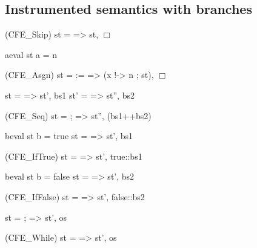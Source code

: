 \documentclass[12pt]{report}
\begin{document}
\subsection{Instrumented semantics with branches}


\par
\noindent\hrulefill\par
\noindent{}                         (CFE\_Skip)
                     st =  => st, \ensuremath{\Box}


                       aeval st a = n
\par
\noindent\hrulefill\par
\noindent{}                 (CFE\_Asgn)
               st =  :=  => (x !-> n ; st), \ensuremath{\Box}


      st  =  => st', bs1   st' =  => st'', bs2
\par
\noindent\hrulefill\par
\noindent{}              (CFE\_Seq)
               st = ; => st'', (bs1++bs2)


            beval st b = true     st =  => st', bs1
\par
\noindent\hrulefill\par
\noindent{}        (CFE\_IfTrue)
        st =        => st', true::bs1


            beval st b = false    st =  => st', bs2
\par
\noindent\hrulefill\par
\noindent{}       (CFE\_IfFalse)
       st =        => st', false::bs2


  st =    ;         => st', os
\par
\noindent\hrulefill\par
\noindent{}   (CFE\_While)
            st =      => st', os
\end{document}
